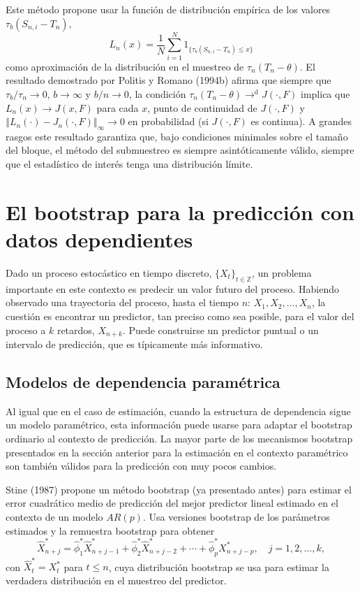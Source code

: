 \documentclass[]{book}
\theoremstyle{break}
\theoremstyle{definition}
\theoremstyle{definition}
\theoremstyle{definition}
\theoremstyle{remark}
\begin{document}
Este método propone usar la función de distribución empírica de los
valores \(\tau _{b}(S_{n,i}-T_n)\),
\[L_n(x)=\frac{1}{N}\sum_{i=1}^{N}1_{\{\tau _{b}(S_{n,i}-T_n)\leq x\}}\]como
aproximación de la distribución en el muestreo de
\(\tau _n(T_n-\theta )\). El resultado demostrado por Politis y Romano
(1994b) afirma que siempre que \(\tau _{b}/\tau _n\rightarrow 0\),
\(b\rightarrow \infty\) y \(b/n\rightarrow 0\), la condición
\(\tau _n(T_n-\theta ){ \rightarrow }^{\mathrm{d}}J(\cdot ,F)\) implica
que \(L_n(x)\rightarrow J(x,F)\) para cada \(x\), punto de continuidad
de \(J(\cdot ,F)\) y
\(\left\Vert L_n(\cdot )-J_n(\cdot ,F)\right\Vert _{\infty }\rightarrow 0\)
en probabilidad (si \(J(\cdot ,F)\) es continua). A grandes rasgos este
resultado garantiza que, bajo condiciones minimales sobre el tamaño del
bloque, el método del submuestreo es siempre asintóticamente válido,
siempre que el estadístico de interés tenga una distribución límite.

\section{El bootstrap para la predicción con datos
dependientes}\label{el-bootstrap-para-la-predicciuxf3n-con-datos-dependientes}

Dado un proceso estocástico en tiempo discreto,
\(\{X_{t}\}_{t\in \mathbb{ Z}}\), un problema importante en este
contexto es predecir un valor futuro del proceso. Habiendo observado una
trayectoria del proceso, hasta el tiempo \(n\): \(X_1,X_2,\ldots ,X_n\),
la cuestión es encontrar un predictor, tan preciso como sea posible,
para el valor del proceso a \(k\) retardos, \(X_{n+k}\). Puede
construirse un predictor puntual o un intervalo de predicción, que es
típicamente más informativo.

\subsection{Modelos de dependencia
paramétrica}\label{modelos-de-dependencia-paramuxe9trica}

Al igual que en el caso de estimación, cuando la estructura de
dependencia sigue un modelo paramétrico, esta información puede usarse
para adaptar el bootstrap ordinario al contexto de predicción. La mayor
parte de los mecanismos bootstrap presentados en la sección anterior
para la estimación en el contexto paramétrico son también válidos para
la predicción con muy pocos cambios.

Stine (1987) propone un método bootstrap (ya presentado antes) para
estimar el error cuadrático medio de predicción del mejor predictor
lineal estimado en el contexto de un modelo \(AR(p)\). Usa versiones
bootstrap de los parámetros estimados y la remuestra bootstrap para
obtener \[\widehat{X}_{n+j}^{\ast}=\widehat{\phi}_1^{\ast}\widehat{X}
_{n+j-1}^{\ast}+\widehat{\phi}_2^{\ast}\widehat{X}_{n+j-2}^{\ast
}+\cdots +\widehat{\phi}_{p}^{\ast}X_{n+j-p}^{\ast},\quad j=1,2,\ldots ,k,\]con
\(\widehat{X}_{t}^{\ast}=X_{t}^{\ast}\) para \(t\leq n\), cuya
distribución bootstrap se usa para estimar la verdadera distribución en
el muestreo del predictor.
\end{document}
